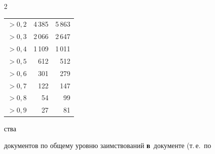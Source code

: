 \begin{multicols}{2}
\begin{center}
{\begin{tabular}{|c|r|r|}
$>0{,}2$& 4\,385\hspace*{5mm}& 5\,863\hspace*{5mm}\\


$>0{,}3$& 2\,066\hspace*{5mm}& 2\,647\hspace*{5mm}\\


$>0{,}4$& 1\,109\hspace*{5mm}& 1\,011\hspace*{5mm}\\


$>0{,}5$& 612\hspace*{5mm} & 512\hspace*{5mm}\\


$>0{,}6$& 301\hspace*{5mm}& 279\hspace*{5mm}\\


$>0{,}7$& 122\hspace*{5mm}& 147\hspace*{5mm}\\


$>0{,}8$& 54\hspace*{5mm}& 99\hspace*{5mm}\\


$>0{,}9$& 27\hspace*{5mm}& 81\hspace*{5mm}\\


\hline


\end{tabular}


}


\vspace*{3pt}


\end{center}









  


  


  \noindent


  ства 


документов по общему уровню заимствований \textbf{в}~документе (т.\,е.\ по 



\end{multicols}
